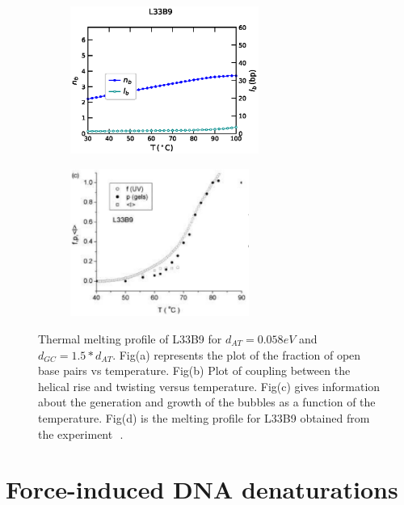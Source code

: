 \documentclass[12pt,masters,final]{UTRGVthesis}
\begin{document}
\begin{figure}[!h]
        \begin{subfigure}[b]{0.49\textwidth}
                \centering
                \includegraphics[height=1.9in, width=.8\textwidth]{L33B9_temp_bub.eps}
                \caption{}
                \label{fig:L33B9bub}
        \end{subfigure}%
        \begin{subfigure}[b]{0.49\textwidth}
                \centering
                \includegraphics[height=1.9in, width=.8\textwidth]{exp_L33B9.eps}
                \caption{}
                \label{fig:L33B9exp}
        \end{subfigure}%
       
       
\caption{Thermal melting profile of L33B9 for $d_{AT}=0.058 eV$ and $d_{GC}=1.5*d_{AT}$. Fig(a) represents the plot of the fraction of open base pairs vs temperature. Fig(b) Plot of coupling between the helical rise and twisting versus temperature. Fig(c) gives information about the generation and growth of the bubbles as a function of the temperature. Fig(d) is the melting profile for  L33B9 obtained from the experiment~\protect\cite{zeng2004bubble}\,. } 
\label{fig:L33b9cal}    

\end{figure}
%
\newpage
\section{Force-induced DNA denaturations}
\end{document}
